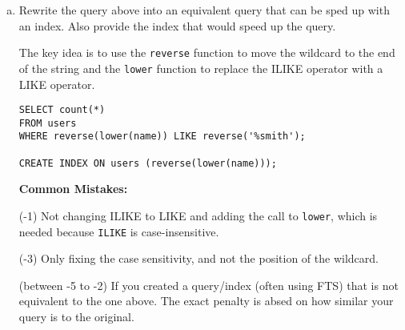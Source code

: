 \documentclass[12pt]{exam}
\theoremstyle{definition}
\begin{document}
\begin{questions}
{\begin{enumerate}[a)]
        \begin{solution}
            Only a btree index can be used to speed up ILIKE/LIKE clauses.
            The leading wildcard in the ILIKE expression means that when scanning the btree,
            we cannot prune any branches from the search and must check every value for a match.

            The above answer is full credit, but it's also important for the second part of the problem that the ILIKE operator must do more comparisons than the LIKE operator because ILIKE is case-insensitive.
            By replacing ILIKE with an equivalent LIKE expression, we can reduce the number of comparisons when the wildcard comes at the end of the string.

            \textbf{Common Mistakes:}

            (-3) Only mentioning case sensitivity.
        \end{solution}

    \item Rewrite the query above into an equivalent query that can be sped up with an index.  Also provide the index that would speed up the query.
        \begin{solution}
            The key idea is to use the \lstinline{reverse} function to move the wildcard to the end of the string and the \lstinline{lower} function to replace the ILIKE operator with a LIKE operator.

\begin{lstlisting}
SELECT count(*)
FROM users
WHERE reverse(lower(name)) LIKE reverse('%smith');

CREATE INDEX ON users (reverse(lower(name)));
\end{lstlisting}

            \textbf{Common Mistakes:}

            (-1) Not changing ILIKE to LIKE and adding the call to \lstinline{lower}, which is needed because \lstinline{ILIKE} is case-insensitive.

            (-3) Only fixing the case sensitivity, and not the position of the wildcard.

            (between -5 to -2) If you created a query/index (often using FTS) that is not equivalent to the one above.  The exact penalty is absed on how similar your query is to the original.
        \end{solution}
\end{enumerate}
}


\newpage
{}
\end{questions}
\end{document}
